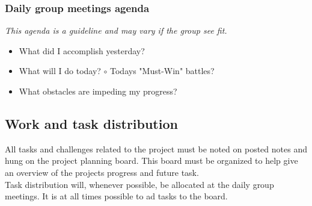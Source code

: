 \subsubsection{Daily group meetings agenda}
\textit{This agenda is a guideline and may vary if the group see fit.}
\begin{itemize}
\item What did I accomplish yesterday?
\item What will I do today?
\subitem $\circ$ Todays "Must-Win" battles?
\item What obstacles are impeding my progress?
\end{itemize}

\subsection{Work and task distribution}
All tasks and challenges related to the project must be noted on posted notes and hung on the project planning board. This board must be organized to help give an overview of the projects progress and future task.\\
Task distribution will, whenever possible, be allocated at the daily group meetings. It is at all times possible to ad tasks to the board.\\

